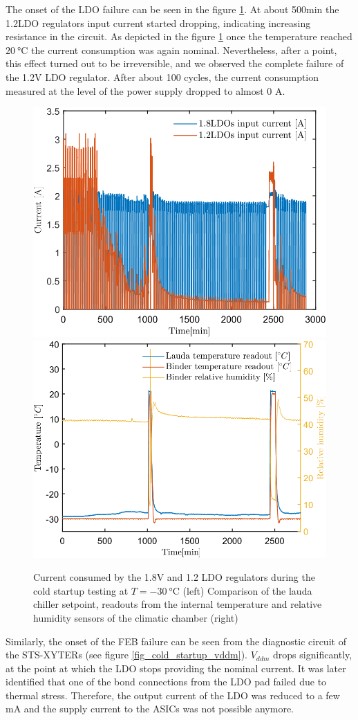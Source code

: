 The onset of the \gls{LDO} failure can be seen in the figure \ref{fig_cold_startup}. At about 500min the 1.2LDO regulators input current started dropping, indicating increasing resistance in the circuit. As depicted in the figure \ref{fig_cold_startup} once the temperature reached $\SI{20}{\celsius}$ the current consumption was again nominal. Nevertheless, after a point, this effect turned out to be irreversible, and we observed the complete failure of the 1.2V \gls{LDO} regulator. After about 100 cycles, the current consumption measured at the level of the power supply dropped to almost 0 A. 
\begin{figure}[!h]
\centering
\includegraphics[width=0.46\columnwidth]{Chapter3/Cycling/Images/currents_long.png}
\includegraphics[width=0.48\columnwidth]{Chapter3/Cycling/Images/cycling.png}
\caption{Current consumed by the 1.8V and 1.2 \gls{LDO} regulators during the cold startup testing at $T = \SI{-30}{\celsius}$ (left)
Comparison of the lauda chiller setpoint, readouts from the internal temperature and relative humidity sensors of the climatic chamber (right)}
\label{fig_cold_startup}
\end{figure}

Similarly, the onset of the \gls{FEB} failure can be seen from the diagnostic circuit of the \gls{STS}-XYTERs (see figure \ref{fig_cold_startup_vddm}). $V_{ddm}$ drops significantly, at the point at which the \gls{LDO} stops providing the nominal current. It was later identified that one of the bond connections from the \gls{LDO} pad failed due to thermal stress. Therefore, the output current of the \gls{LDO} was reduced to a few mA and the supply current to the \glspl{ASIC} was not possible anymore.

